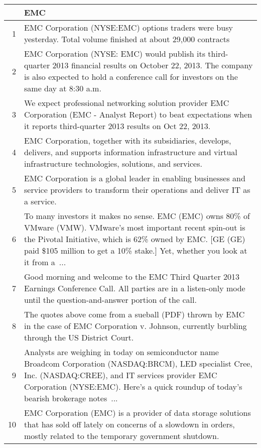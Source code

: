 \documentclass{tufte-handout}\usepackage[]{graphicx}\usepackage[]{color}
\begin{document}
\begin{tabularx}{\textwidth}{rX}
  \hline
 & EMC \\ 
  \hline
1 &  EMC Corporation (NYSE:EMC) options traders were busy yesterday. Total volume finished at about 29,000 contracts  \\ 
  2 &  EMC Corporation (NYSE: EMC) would publish its third-quarter 2013 financial results on October 22, 2013. The company is also expected to hold a conference call for investors on the same day at 8:30 a.m.  \\ 
  3 &  We expect professional networking solution provider EMC Corporation (EMC - Analyst Report) to beat expectations when it reports third-quarter 2013 results on Oct 22, 2013.  \\ 
  4 &  EMC Corporation, together with its subsidiaries, develops, delivers, and supports information infrastructure and virtual infrastructure technologies, solutions, and services.  \\ 
  5 &  EMC Corporation is a global leader in enabling businesses and service providers to transform their operations and deliver IT as a service.  \\ 
  6 &  To many investors it makes no sense. EMC (EMC) owns 80\% of VMware (VMW). VMware's most important recent spin-out is the Pivotal Initiative, which is 62\% owned by EMC. [GE (GE) paid \$105 million to get a 10\% stake.] Yet, whether you look at it from a ...  \\ 
  7 &  Good morning and welcome to the EMC Third Quarter 2013 Earnings Conference Call. All parties are in a listen-only mode until the question-and-answer portion of the call.  \\ 
  8 &  The quotes above come from a sueball (PDF) thrown by EMC in the case of EMC Corporation v. Johnson, currently burbling through the US District Court.  \\ 
  9 &  Analysts are weighing in today on semiconductor name Broadcom Corporation (NASDAQ:BRCM), LED specialist Cree, Inc. (NASDAQ:CREE), and IT services provider EMC Corporation (NYSE:EMC). Here's a quick roundup of today's bearish brokerage notes ...  \\ 
  10 &  EMC Corporation (EMC) is a provider of data storage solutions that has sold off lately on concerns of a slowdown in orders, mostly related to the temporary government shutdown.  \\ 
   \hline
\end{tabularx}
\end{document}
